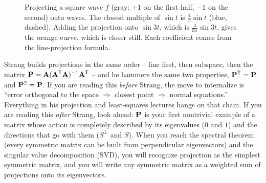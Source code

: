 \begin{figure}[htbp]
\centering
{}
\caption{Projecting a square wave $f$ (gray: $+1$ on the first half, $-1$ on the second) onto
waves. The closest multiple of $\sin t$ is $\tfrac{4}{\pi}\sin t$ (blue, dashed). Adding the
projection onto $\sin 3t$, which is $\tfrac{4}{3\pi}\sin 3t$, gives the orange curve, which is
closer still. Each coefficient comes from the line-projection formula.}
\label{ch18:fourier-fig}
\end{figure}

\begin{strangbox}
Strang builds projections in the same order -- line first, then subspace, then the matrix
$\mathbf{P}=\mathbf{A}(\mathbf{A}^{\mathsf{T}}\mathbf{A})^{-1}\mathbf{A}^{\mathsf{T}}$ -- and he hammers the same two properties,
$\mathbf{P}^{\mathsf{T}}=\mathbf{P}$ and $\mathbf{P}^2=\mathbf{P}$. If you are reading this \emph{before} Strang, the move
to internalize is ``error orthogonal to the space $\Rightarrow$ closest point $\Rightarrow$ normal
equations.'' Everything in his projection and least-squares lectures hangs on that chain. If you are
reading this \emph{after} Strang, look ahead: $\mathbf{P}$ is your first nontrivial example of a matrix
whose action is completely described by its eigenvalues ($0$ and $1$) and the directions that go
with them ($S^\perp$ and $S$). When you reach the spectral theorem (every symmetric matrix can be
built from perpendicular eigenvectors) and the singular value decomposition (SVD), you will
recognize projection as the simplest symmetric matrix, and you will write any symmetric matrix as a
weighted sum of projections onto its eigenvectors.
\end{strangbox}

